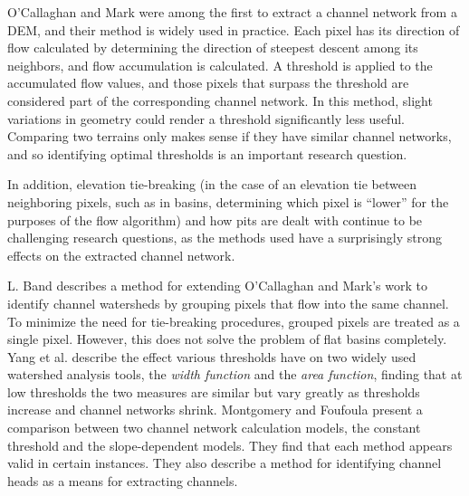 O'Callaghan and Mark \cite{OCALLAGHAN-Extraction} were among the first
to extract a channel network from a DEM, and their method is widely used in practice. 
Each pixel has its direction of flow calculated by determining the direction of steepest descent among its neighbors, and flow accumulation is calculated.
A threshold is applied to the accumulated flow values, and those pixels that surpass the threshold are considered part of the corresponding channel network.
% 
In this method, slight variations in geometry could render a threshold significantly less useful.
Comparing two terrains only makes sense if they have similar channel networks, 
and so identifying optimal thresholds 
is an important research question.

In addition, elevation tie-breaking (in the case of an elevation tie between neighboring pixels, such as in basins, determining which pixel is ``lower'' for the purposes of the flow algorithm) and how pits are dealt with continue to be challenging research questions, as the methods used have a surprisingly strong effects on the extracted channel network.

L. Band \cite{band86} describes a method for extending O'Callaghan and
Mark's work to identify channel watersheds by grouping pixels that
flow into the same channel. To minimize the need for tie-breaking procedures, grouped pixels are treated as a single pixel.
However, this does not solve the problem of flat basins completely.
Yang et al. \cite{YANG-geomorphic} describe the effect various
thresholds have on two widely used watershed analysis tools, the {\em
  width function} and the {\em area function}, finding that at low
thresholds the two measures are similar but vary greatly as thresholds
increase and channel networks shrink. 
Montgomery and Foufoula \cite{MONTGOMERY-1993} present a
comparison between 
two channel network calculation models, the constant threshold and the slope-dependent models.
They find that each
method appears valid in certain instances. They also describe a method
for identifying channel heads as a means for extracting channels.

